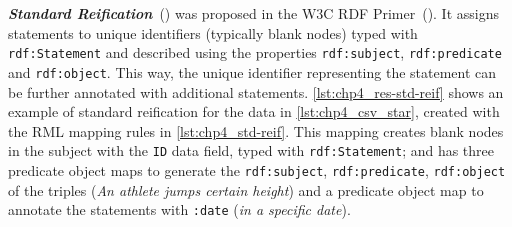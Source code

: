 \noindent\textbf{\textit{Standard Reification}}~(\cite{manola2004rdf}) was proposed in the W3C RDF Primer~(\cite{manola2004rdf}).
It assigns statements to unique identifiers (typically blank nodes) typed with \texttt{rdf:Statement} and described using the properties \texttt{rdf:subject}, \texttt{rdf:predicate} and \texttt{rdf:object}.
This way, the unique identifier representing the statement can be further annotated with additional statements. \cref{lst:chp4_res-std-reif} shows an example of standard reification for the data in \cref{lst:chp4_csv_star}, created with the RML mapping rules in \cref{lst:chp4_std-reif}. 
This mapping creates blank nodes in the subject with the \texttt{ID} data field, typed with \texttt{rdf:Statement}; and has three predicate object maps to generate the \texttt{rdf:subject}, \texttt{rdf:predicate}, \texttt{rdf:object} of the triples (\textit{An athlete jumps certain height}) and a predicate object map to annotate the statements with \texttt{:date} (\textit{in a specific date}).


